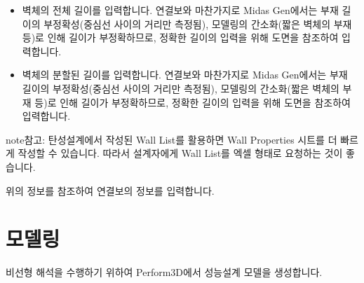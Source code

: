 \documentclass[a4paper,11pt,korean,openany,oneside]{sphinxmanual}
\begin{document}
\begin{itemize}
\begin{description}
\begin{sphinxadmonition}{note}{참고:}
\sphinxAtStartPar
사용자의 편의에 따라 아래와 같이 철근의 Type과 Spacing을 나누지 않고 입력하여도 무방합니다.
\end{sphinxadmonition}

\end{description}

\item {} \begin{description}
\sphinxAtStartPar
벽체의 전체 길이를 입력합니다.
연결보와 마찬가지로 Midas Gen에서는 부재 길이의 부정확성(중심선 사이의 거리만 측정됨),
모델링의 간소화(짧은 벽체의 부재 등)로 인해 길이가 부정확하므로,
정확한 길이의 입력을 위해 도면을 참조하여 입력합니다.

\end{description}

\item {} \begin{description}
\sphinxAtStartPar
벽체의 분할된 길이를 입력합니다.
연결보와 마찬가지로 Midas Gen에서는 부재 길이의 부정확성(중심선 사이의 거리만 측정됨),
모델링의 간소화(짧은 벽체의 부재 등)로 인해 길이가 부정확하므로,
정확한 길이의 입력을 위해 도면을 참조하여 입력합니다.

\end{description}

\end{itemize}

\begin{sphinxadmonition}{note}{참고:}
\sphinxAtStartPar
탄성설계에서 작성된 Wall List를 활용하면 Wall Properties 시트를 더 빠르게 작성할 수 있습니다.
따라서 설계자에게 Wall List를 엑셀 형태로 요청하는 것이 좋습니다.
\end{sphinxadmonition}

\begin{sphinxShadowBox}

\sphinxAtStartPar
위의 정보를 참조하여 연결보의 정보를 입력합니다.
\end{sphinxShadowBox}

\sphinxstepscope


\chapter{모델링}
\label{\detokenize{3_modelling:id1}}\label{\detokenize{3_modelling::doc}}
\sphinxAtStartPar
비선형 해석을 수행하기 위하여 Perform\sphinxhyphen{}3D에서 성능설계 모델을 생성합니다.
\end{document}
